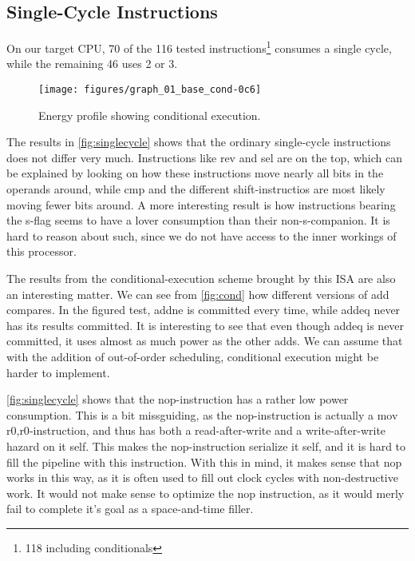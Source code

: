 \subsection{Single-Cycle Instructions}
On our target CPU, 70 of the 116 tested instructions\footnote{118 including conditionals} consumes a single cycle,
while the remaining 46 uses 2 or 3.

\begin{figure}
    \centering
    \texttt{[image: figures/graph\_01\_base\_cond-0c6]}
    \caption{Energy profile showing conditional execution.}
    \label{fig:cond}
\end{figure}

The results in \autoref{fig:singlecycle} shows that the ordinary single-cycle instructions
does not differ very much. Instructions like {\ttfamily rev} and {\ttfamily sel} are on the
top, which can be explained by looking on how these instructions move nearly all bits in
the operands around, while {\ttfamily cmp} and the different shift-instructios are most likely
moving fewer bits around. A more interesting result is how instructions bearing the {\ttfamily s}-flag
seems to have a lover consumption than their non-{\ttfamily s}-companion. It is hard to reason about
such, since we do not have access to the inner workings of this processor.

The results from the conditional-execution scheme brought by this ISA are also an interesting matter. We
can see from \autoref{fig:cond} how different versions of {\ttfamily add} compares. In the figured test,
{\ttfamily addne} is committed every time, while {\ttfamily addeq} never has its results committed. It is
interesting to see that even though {\ttfamily addeq} is never committed, it uses almost as much power as
the other {\ttfamily add}s. We can assume that with the addition of out-of-order scheduling, conditional
execution might be harder to implement.

\autoref{fig:singlecycle} shows that the {\ttfamily nop}-instruction has a rather low power consumption. This
is a bit missguiding, as the {\ttfamily nop}-instruction is actually a {\ttfamily mov r0,r0}-instruction, and thus
has both a read-after-write and a write-after-write hazard on it self. This makes the {\ttfamily nop}-instruction
serialize it self, and it is hard to fill the pipeline with this instruction. With this in mind, it makes sense
that {\ttfamily nop} works in this way, as it is often used to fill out clock cycles with non-destructive work. It
would not make sense to optimize the {\ttfamily nop} instruction, as it would merly fail to complete it's goal as
a space-and-time filler.

